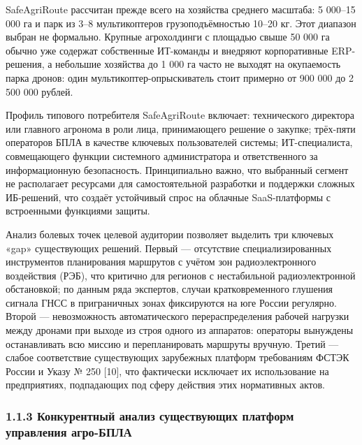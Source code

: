 \documentclass[14pt,a4paper]{extarticle}
\begin{document}
SafeAgriRoute рассчитан прежде всего на хозяйства среднего масштаба: 5 000--15 000 га и парк из 3--8 мультикоптеров грузоподъёмностью 10--20 кг. Этот диапазон выбран не формально. Крупные агрохолдинги с площадью свыше 50 000 га обычно уже содержат собственные ИТ-команды и внедряют корпоративные ERP-решения, а небольшие хозяйства до 1 000 га часто не выходят на окупаемость парка дронов: один мультикоптер-опрыскиватель стоит примерно от 900 000 до 2 500 000 рублей.

Профиль типового потребителя SafeAgriRoute включает: технического директора или главного агронома в роли лица, принимающего решение о закупке; трёх-пяти операторов БПЛА в качестве ключевых пользователей системы; ИТ-специалиста, совмещающего функции системного администратора и ответственного за информационную безопасность. Принципиально важно, что выбранный сегмент не располагает ресурсами для самостоятельной разработки и поддержки сложных ИБ-решений, что создаёт устойчивый спрос на облачные SaaS-платформы с встроенными функциями защиты.

Анализ болевых точек целевой аудитории позволяет выделить три ключевых «gap» существующих решений. Первый --- отсутствие специализированных инструментов планирования маршрутов с учётом зон радиоэлектронного воздействия (РЭБ), что критично для регионов с нестабильной радиоэлектронной обстановкой; по данным ряда экспертов, случаи кратковременного глушения сигнала ГНСС в приграничных зонах фиксируются на юге России регулярно. Второй --- невозможность автоматического перераспределения рабочей нагрузки между дронами при выходе из строя одного из аппаратов: операторы вынуждены останавливать всю миссию и перепланировать маршруты вручную. Третий --- слабое соответствие существующих зарубежных платформ требованиям ФСТЭК России и Указу № 250 {[}10{]}, что фактически исключает их использование на предприятиях, подпадающих под сферу действия этих нормативных актов.

\hypertarget{ux43aux43eux43dux43aux443ux440ux435ux43dux442ux43dux44bux439-ux430ux43dux430ux43bux438ux437-ux441ux443ux449ux435ux441ux442ux432ux443ux44eux449ux438ux445-ux43fux43bux430ux442ux444ux43eux440ux43c-ux443ux43fux440ux430ux432ux43bux435ux43dux438ux44f-ux430ux433ux440ux43e-ux431ux43fux43bux430}{%
\subsubsection{1.1.3 Конкурентный анализ существующих платформ управления агро-БПЛА}\label{ux43aux43eux43dux43aux443ux440ux435ux43dux442ux43dux44bux439-ux430ux43dux430ux43bux438ux437-ux441ux443ux449ux435ux441ux442ux432ux443ux44eux449ux438ux445-ux43fux43bux430ux442ux444ux43eux440ux43c-ux443ux43fux440ux430ux432ux43bux435ux43dux438ux44f-ux430ux433ux440ux43e-ux431ux43fux43bux430}}
\end{document}
